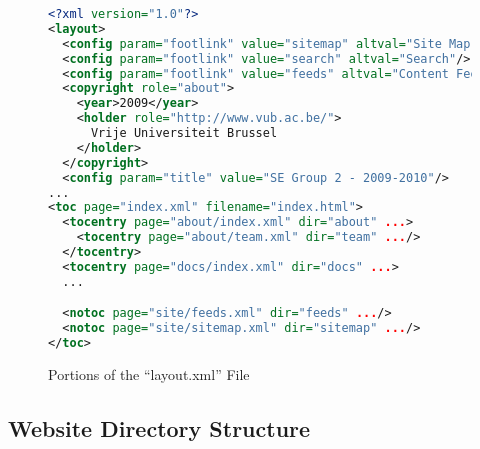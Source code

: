 \begin{figure}\caption{Portions of the ``layout.xml'' File}
\label{WebsiteLayoutFile}
\begin{lstlisting}[language=XML]
<?xml version="1.0"?>
<layout>
  <config param="footlink" value="sitemap" altval="Site Map"/>
  <config param="footlink" value="search" altval="Search"/>
  <config param="footlink" value="feeds" altval="Content Feeds"/>
  <copyright role="about">
    <year>2009</year>
    <holder role="http://www.vub.ac.be/">
      Vrije Universiteit Brussel
    </holder>
  </copyright>
  <config param="title" value="SE Group 2 - 2009-2010"/>
...
<toc page="index.xml" filename="index.html">
  <tocentry page="about/index.xml" dir="about" ...>
    <tocentry page="about/team.xml" dir="team" .../>
  </tocentry>
  <tocentry page="docs/index.xml" dir="docs" ...>
  ...

  <notoc page="site/feeds.xml" dir="feeds" .../>
  <notoc page="site/sitemap.xml" dir="sitemap" .../>
</toc>
\end{lstlisting}
\end{figure}


\subsection{Website Directory Structure}\label{WebsiteDirectoryStructure}

